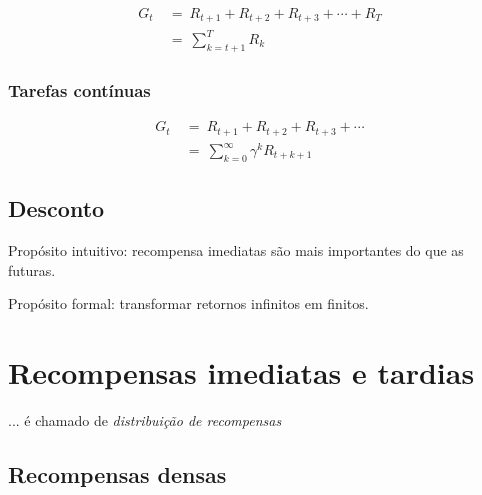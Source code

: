 \documentclass{article}
\begin{document}
                \begin{equation}
                \begin{split}
                    G_t & \ = \ R_{t+1} + R_{t+2} + R_{t+3} + \cdots + R_T \\
                    & \ = \ \sum_{k=t+1}^{T} R_k
                \end{split}
                \end{equation}

            \subsubsection{Tarefas contínuas}
        
                \begin{equation}
                \begin{split}
                    G_t & \ = \ R_{t+1} + R_{t+2} + R_{t+3} + \cdots \\
                    & \ = \ \sum_{k=0}^{\infty} \gamma^k R_{t + k + 1}
                \end{split}
                \end{equation}
        
        \subsection{Desconto}
        
            Propósito intuitivo: recompensa imediatas são mais importantes do que as futuras.
            
            Propósito formal: transformar retornos infinitos em finitos.
    
    \section{Recompensas imediatas e tardias}
    
        ... é chamado de \emph{distribuição de recompensas}
    
        \subsection{Recompensas densas}
        
\end{document}
